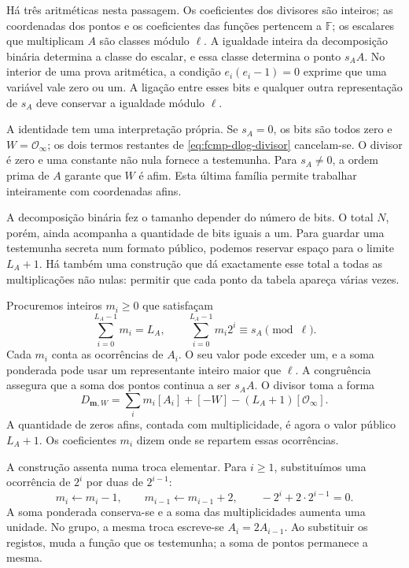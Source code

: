 Há três aritméticas nesta passagem. Os coeficientes dos divisores são
inteiros; as coordenadas dos pontos e os coeficientes das funções
pertencem a \(\mathbb F\); os escalares que multiplicam \(A\)
são classes módulo \(\ell\). A igualdade inteira da decomposição
binária determina a classe do escalar, e essa classe determina o ponto
\(s_AA\). No interior de uma prova aritmética, a condição
\(e_i(e_i-1)=0\) exprime que uma variável vale zero ou um. A ligação
entre esses bits e qualquer outra representação de \(s_A\) deve
conservar a igualdade módulo \(\ell\).

A identidade tem uma interpretação própria. Se \(s_A=0\), os bits
são todos zero e \(W=\mathcal O_\infty\); os dois termos restantes
de \eqref{eq:fcmp-dlog-divisor} cancelam-se. O divisor é zero e uma
constante não nula fornece a testemunha. Para \(s_A\ne0\), a ordem
prima de \(A\) garante que \(W\) é afim. Esta última família
permite trabalhar inteiramente com coordenadas afins.


A decomposição binária fez o tamanho depender do número de bits. O
total \(N\), porém, ainda acompanha a quantidade de bits iguais a
um. Para guardar uma testemunha secreta num formato público, podemos
reservar espaço para o limite \(L_A+1\). Há também uma construção
que dá exactamente esse total a todas as multiplicações não nulas:
permitir que cada ponto da tabela apareça várias vezes.

Procuremos inteiros \(m_i\geq0\) que satisfaçam
\begin{equation}
 \sum_{i=0}^{L_A-1}m_i=L_A,
 \qquad
 \sum_{i=0}^{L_A-1}m_i2^i\equiv s_A\pmod\ell.
 \label{eq:divisors-fixed-multiplicity}
\end{equation}
Cada \(m_i\) conta as ocorrências de \(A_i\). O seu valor pode
exceder um, e a soma ponderada pode usar um representante inteiro
maior que \(\ell\). A congruência assegura que a soma dos pontos
continua a ser \(s_AA\). O divisor toma a forma
\begin{equation}
 D_{\boldsymbol m,W}
 =\sum_i m_i[A_i]+[-W]-(L_A+1)[\mathcal O_\infty].
 \label{eq:divisors-fixed-size-divisor}
\end{equation}
A quantidade de zeros afins, contada com multiplicidade, é agora o
valor público \(L_A+1\). Os coeficientes \(m_i\) dizem onde
se repartem essas ocorrências.

A construção assenta numa troca elementar. Para \(i\geq1\),
substituímos uma ocorrência de \(2^i\) por duas de \(2^{i-1}\):
\[
 m_i\longleftarrow m_i-1,
 \qquad m_{i-1}\longleftarrow m_{i-1}+2,
 \qquad -2^i+2\cdot2^{i-1}=0.
\]
A soma ponderada conserva-se e a soma das multiplicidades aumenta
uma unidade. No grupo, a mesma troca escreve-se
\(A_i=2A_{i-1}\). Ao substituir os registos, muda a função
que os testemunha; a soma de pontos permanece a mesma.

